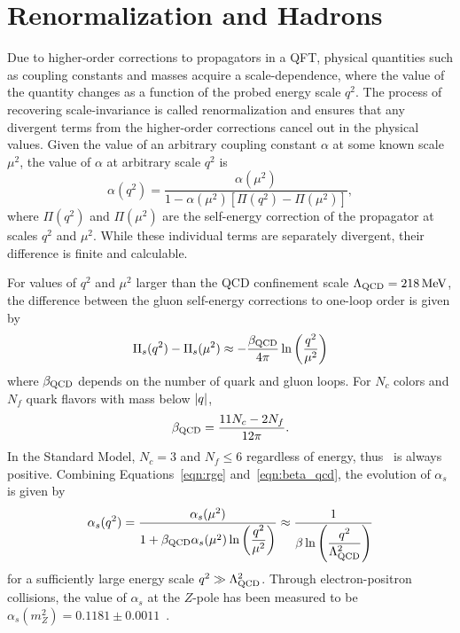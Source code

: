 \section{Renormalization and Hadrons}
\label{sec:hadrons}

Due to higher-order corrections to propagators in a QFT, physical quantities such as coupling constants and masses acquire a scale-dependence, where the value of the quantity changes as a function of the probed energy scale $q^2$.
The process of recovering scale-invariance is called renormalization and ensures that any divergent terms from the higher-order corrections cancel out in the physical values.
Given the value of an arbitrary coupling constant $\alpha$ at some known scale $\mu^2$, the value of $\alpha$ at arbitrary scale $q^2$ is  
\begin{equation}
  \label{eqn:rge}
  \alpha (q^2) = \frac{\alpha(\mu^2)}{1 - \alpha(\mu^2) \left[ \Pi(q^2) - \Pi(\mu^2) \right]},
\end{equation}
where $\Pi(q^2)$ and $\Pi(\mu^2)$ are the self-energy correction of the propagator at scales $q^2$ and $\mu^2$.
While these individual terms are separately divergent, their difference is finite and calculable. 

For values of $q^2$ and $\mu^2$ larger than the QCD confinement scale $\Lambda_{\text{QCD}} = 218\,\text{Me\hspace{-.08em}V}$, the difference between the gluon self-energy corrections to one-loop order is given by 
\begin{equation}
  \label{eqn:beta_qcd}
  \Pi_s(q^2) - \Pi_s(\mu^2) \approx - \frac{\beta_{\text{QCD}}}{4\pi} \ln \left( \dfrac{q^2}{\mu^2} \right)
\end{equation}
where $\beta_{\text{QCD}}$ depends on the number of quark and gluon loops.
For $N_c$ colors and $N_f$ quark flavors with mass below $\lvert q \rvert$,
\begin{equation}
  \beta_{\text{QCD}} = \frac{11 N_c - 2 N_f}{12 \pi}. 
\end{equation}
In the Standard Model, $N_c = 3$ and $N_f \le 6$ regardless of energy, thus \bqcd\ is always positive.
Combining Equations~\ref{eqn:rge} and~\ref{eqn:beta_qcd}, the evolution of $\alpha_s$ is given by
\begin{equation}
  \label{eqn:alpha_s}
  \alpha_s (q^2) = \frac{\alpha_s(\mu^2)}{1 + \beta_{\text{QCD}} \alpha_s (\mu^2) \ln \left( \dfrac{q^2}{\mu^2} \right)} \approx \frac{1}{\beta \ln \left( \dfrac{q^2}{\Lambda_{\text{QCD}}^2} \right)}
\end{equation}
for a sufficiently large energy scale $q^2 \gg \Lambda_{\text{QCD}}^2$.
Through electron-positron collisions, the value of $\alpha_s$ at the $Z$-pole has been measured to be $\alpha_s (m_Z^2) = 0.1181 \pm 0.0011$~\cite{PDG2018}.


